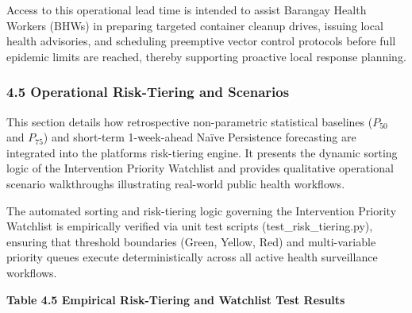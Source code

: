 \documentclass[
]{article}
\begin{document}
Access to this operational lead time is intended to assist Barangay
Health Workers (BHWs) in preparing targeted container cleanup drives,
issuing local health advisories, and scheduling preemptive vector
control protocols before full epidemic limits are reached, thereby
supporting proactive local response planning.

\subsubsection{\texorpdfstring{\textbf{4.5 Operational Risk-Tiering and
Scenarios}
}{4.5 Operational Risk-Tiering and Scenarios }}\label{operational-risk-tiering-and-scenarios}

This section details how retrospective non-parametric statistical
baselines (\(P_{50}\) and \(P_{75}\)) and short-term 1-week-ahead Naïve
Persistence forecasting are integrated into the
platform\textquotesingle s risk-tiering engine. It presents the dynamic
sorting logic of the Intervention Priority Watchlist and provides
qualitative operational scenario walkthroughs illustrating real-world
public health workflows.

The automated sorting and risk-tiering logic governing the Intervention
Priority Watchlist is empirically verified via unit test scripts
(test\_risk\_tiering.py), ensuring that threshold boundaries (Green,
Yellow, Red) and multi-variable priority queues execute
deterministically across all active health surveillance workflows.

\textbf{Table 4.5 Empirical Risk-Tiering and Watchlist Test Results}
\end{document}
